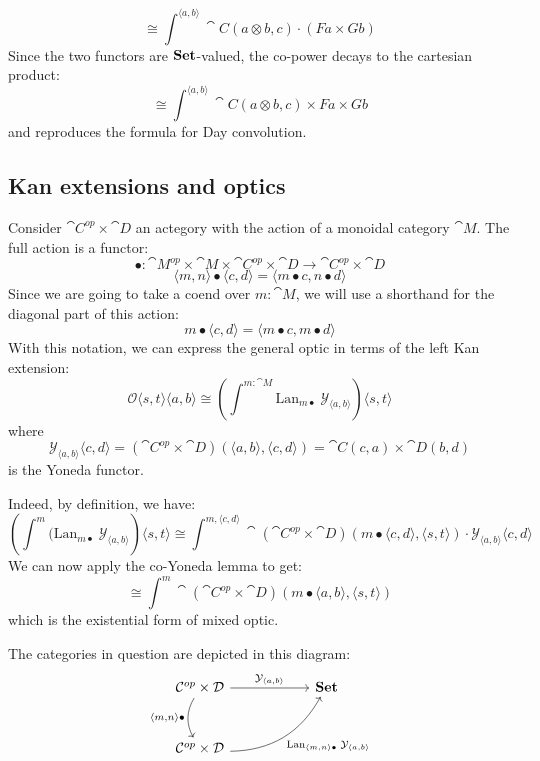 \documentclass[DaoFP]{subfiles}
\begin{document}
\[ \cong \int^{\langle a, b\rangle} \cat C ( a \otimes b, c) \cdot (F a \times G  b) \]
Since the two functors are $\mathbf{Set}$-valued, the co-power decays to the cartesian product:
\[ \cong \int^{\langle a, b\rangle} \cat C ( a \otimes b, c) \times F a \times G  b \]
and reproduces the formula for Day convolution.

\subsection{Kan extensions and optics}

Consider $\cat C^{op} \times \cat D$ an actegory with the action of a monoidal category $\cat M$. The full action is a functor:
\[ \bullet \colon \cat M^{op} \times \cat M \times \cat C^{op} \times \cat D \to  \cat C^{op} \times \cat D \]
\[  \langle m, n  \rangle \bullet \langle c, d \rangle = \langle m \bullet c, n \bullet d \rangle \]
Since we are going to take a coend over $m \colon \cat M$, we will use a shorthand for the diagonal part of this action:
\[ m \bullet \langle c, d \rangle = \langle m \bullet c, m \bullet d \rangle \]
With this notation, we can express the general optic in terms of the left Kan extension:
\[ \mathcal{O} \langle s, t \rangle \langle a, b \rangle \cong \left(\int^{m \colon \cat M} \text{Lan}_{m \bullet} \;\mathcal Y_{\langle a, b \rangle}\right) \langle s, t \rangle \]
where
\[ \mathcal Y_{\langle a, b \rangle} \langle c, d \rangle = (\cat C^{op} \times \cat D)(\langle a, b \rangle, \langle c, d \rangle) = \cat C(c, a) \times \cat D(b, d) \]
is the Yoneda functor.

Indeed, by definition, we have:
\[ \left( \int^m (\text{Lan}_{m \bullet} \; \mathcal Y_{\langle a, b \rangle} \right) \langle s, t \rangle \cong 
\int^{m, \langle c, d \rangle} \cat (\cat C^{op} \times \cat D)(m \bullet \langle c, d \rangle, \langle s, t \rangle) \cdot \mathcal Y_{\langle a, b \rangle} \langle c, d \rangle \]
We can now apply the co-Yoneda lemma to get:
\[ \cong \int^m \cat (\cat C^{op} \times \cat D)(m \bullet \langle a, b \rangle, \langle s, t \rangle)\]
which is the existential form of mixed optic.

The categories in question are depicted in this diagram:
\[
 \begin{tikzcd} [row sep=1cm, column sep=1cm]
 \cat C^{op} \times \cat D
 \arrow[rr, "\mathcal Y_{\langle a, b \rangle}", "" {name=ID, below} ]
 \arrow[d, bend right, "{\langle m, n \rangle \bullet}"']
 && \Set
 \\
 \cat C^{op} \times \cat D
  \arrow[urr, bend right, "{\text{Lan}_{\langle m, n \rangle \bullet}\; \mathcal Y_{\langle a, b \rangle}}"']
 \end{tikzcd}
\]
\end{document}
